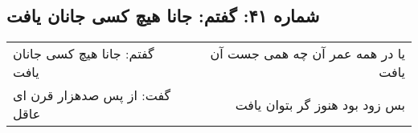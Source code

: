 \begin{center}
\section*{شماره ۴۱: گفتم: جانا هیچ کسی جانان یافت}
\label{sec:041}
\begin{longtable}{l p{0.5cm} r}
گفتم: جانا هیچ کسی جانان یافت
&&
یا در همه عمر آن چه همی جست آن یافت
\\
گفت: از پس صدهزار قرن ای عاقل
&&
بس زود بود هنوز گر بتوان یافت
\\
\end{longtable}
\end{center}
